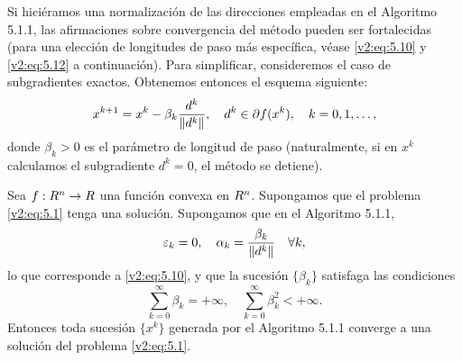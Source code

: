 Si hiciéramos una normalización de las direcciones empleadas en el Algoritmo 5.1.1, las afirmaciones sobre convergencia del método pueden ser fortalecidas (para una elección de longitudes de paso más específica, véase \eqref{v2:eq:5.10} y \eqref{v2:eq:5.12} a continuación). Para simplificar, consideremos el caso de subgradientes exactos. Obtenemos entonces el esquema siguiente:
\begin{equation}
    x^{k+1} = x^k - \beta_k \frac{d^k}{\lVert d^k\rVert}, \quad d^k \in \partial f(x^k), \quad k = 0, 1, \dots,
    \label{v2:eq:5.10}
\end{equation}
donde $\beta_k > 0$ es el parámetro de longitud de paso (naturalmente, si en $x^k$ calculamos el subgradiente $d^k = 0$, el método se detiene).

\begin{theorem}\label{v2:thm:5.1.2}
    Sea $f : R^n \to R$ una función convexa en $R^n$. Supongamos que el problema \eqref{v2:eq:5.1} tenga una solución. Supongamos que en el Algoritmo 5.1.1,
    \begin{equation}
        \varepsilon_k = 0, \quad \alpha_k = \frac{\beta_k}{\lVert d^k\rVert} \quad \forall k,
        \label{v2:eq:5.11}
    \end{equation}
    lo que corresponde a \eqref{v2:eq:5.10}, y que la sucesión $\{\beta_k\}$ satisfaga las condiciones
    \begin{equation}
        \sum_{k=0}^\infty \beta_k = +\infty, \quad \sum_{k=0}^\infty \beta_k^2 < +\infty.
        \label{v2:eq:5.12}
    \end{equation}
    Entonces toda sucesión $\{x^k\}$ generada por el Algoritmo 5.1.1 converge a una solución del problema \eqref{v2:eq:5.1}.
\end{theorem}

